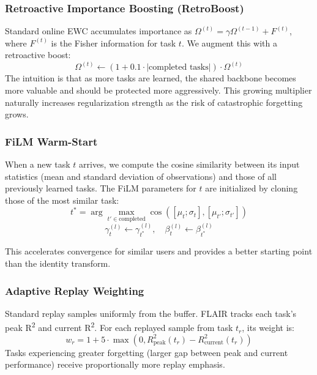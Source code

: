 \documentclass[3p,times,procedia]{elsarticle}
\begin{document}
\subsubsection{Retroactive Importance Boosting (RetroBoost)}

Standard online EWC accumulates importance as $\Omega^{(t)} = \gamma \Omega^{(t-1)} + F^{(t)}$, where $F^{(t)}$ is the Fisher information for task $t$. We augment this with a retroactive boost:
\begin{equation}
    \Omega^{(t)} \leftarrow \left(1 + 0.1 \cdot |\text{completed tasks}|\right) \cdot \Omega^{(t)}
\end{equation}
The intuition is that as more tasks are learned, the shared backbone becomes more valuable and should be protected more aggressively. This growing multiplier naturally increases regularization strength as the risk of catastrophic forgetting grows.

\subsubsection{FiLM Warm-Start}

When a new task $t$ arrives, we compute the cosine similarity between its input statistics (mean and standard deviation of observations) and those of all previously learned tasks. The FiLM parameters for $t$ are initialized by cloning those of the most similar task:
\begin{equation}
    t^* = \arg\max_{t' \in \text{completed}} \cos\left([\mu_t; \sigma_t], [\mu_{t'}; \sigma_{t'}]\right)
\end{equation}
\begin{equation}
    \gamma_t^{(l)} \leftarrow \gamma_{t^*}^{(l)}, \quad \beta_t^{(l)} \leftarrow \beta_{t^*}^{(l)}
\end{equation}

This accelerates convergence for similar users and provides a better starting point than the identity transform.

\subsubsection{Adaptive Replay Weighting}
\label{sec:adaptive}

Standard replay samples uniformly from the buffer. FLAIR tracks each task's peak R\textsuperscript{2} and current R\textsuperscript{2}. For each replayed sample from task $t_r$, its weight is:
\begin{equation}
    w_r = 1 + 5 \cdot \max\left(0, R^2_{\text{peak}}(t_r) - R^2_{\text{current}}(t_r)\right)
\end{equation}
Tasks experiencing greater forgetting (larger gap between peak and current performance) receive proportionally more replay emphasis.
\end{document}
